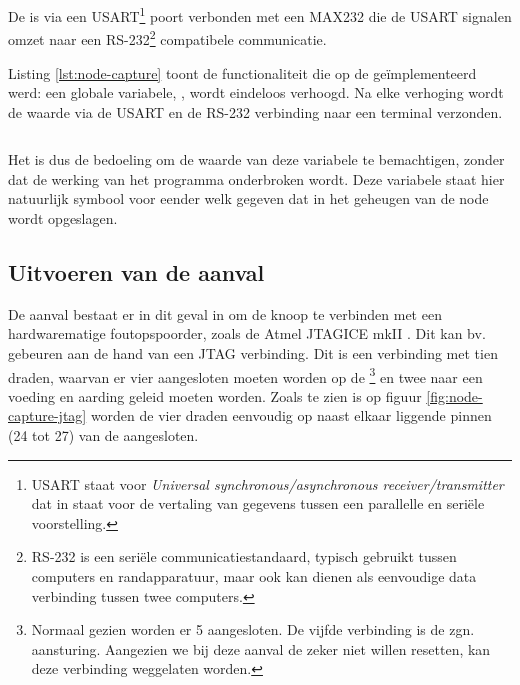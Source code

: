 De \mcu is via een USART\footnote{USART staat voor \emph{Universal
synchronous/asynchronous receiver/transmitter} dat in staat voor de vertaling
van gegevens tussen een parallelle en seri\"ele voorstelling.} poort verbonden
met een MAX232 \cite{datasheet:max232} die de USART signalen omzet naar een
RS-232\footnote{RS-232 is een seri\"ele communicatiestandaard, typisch gebruikt
tussen computers en randapparatuur, maar ook kan dienen als eenvoudige data
verbinding tussen twee computers.} compatibele communicatie.

Listing \ref{lst:node-capture} toont de functionaliteit die op de \mcu
ge\"implementeerd werd: een globale variabele, , wordt eindeloos
verhoogd. Na elke verhoging wordt de waarde via de USART en de RS-232
verbinding naar een terminal verzonden. 

\inputminted[linenos,frame=lines,framesep=2mm,fontsize=\footnotesize]{c}{../src/node-capture/main.c}
\vspace{-5mm}
\vspace{3mm}

Het is dus de bedoeling om de waarde van deze  variabele te
bemachtigen, zonder dat de werking van het programma onderbroken wordt. Deze
variabele staat hier natuurlijk symbool voor eender welk gegeven dat in het
geheugen van de node wordt opgeslagen.

\subsection{Uitvoeren van de aanval}

De aanval bestaat er in dit geval in om de knoop te verbinden met een
hardwarematige foutopspoorder, zoals de Atmel JTAGICE mkII
\cite{manual:jtagicemkii}. Dit kan bv. gebeuren aan de hand van een JTAG
verbinding. Dit is een verbinding met tien draden, waarvan er vier aangesloten
moeten worden op de \mcu\footnote{Normaal gezien worden er 5 aangesloten. De
vijfde verbinding is de zgn.  aansturing. Aangezien we bij deze
aanval de \mcu zeker niet willen resetten, kan deze verbinding weggelaten
worden.} en twee naar een voeding en aarding geleid moeten worden. Zoals te
zien is op figuur \ref{fig:node-capture-jtag} worden de vier draden eenvoudig
op naast elkaar liggende pinnen (24 tot 27) van de \mcu aangesloten.

